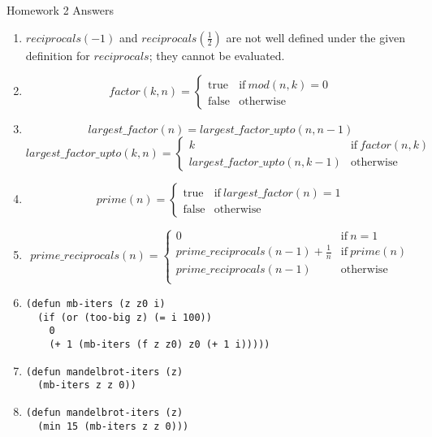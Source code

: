 \documentclass{article}
\begin{document}
  \begin{center}
    {\Large Homework 2 Answers}
  \end{center}
  \begin{enumerate}
    \item
      $reciprocals(-1)$ and $reciprocals(\frac12)$ are not well defined under the given definition for $reciprocals$; they cannot be evaluated.
    \item
      \[ factor(k, n) = \left\{
        \begin{array}{ll}
          \mathrm{true} & \mathrm{if\ } mod(n, k) = 0 \\
          \mathrm{false} & \mathrm{otherwise}
        \end{array}
      \right. \]
    \item
      \[ largest\_factor(n) = largest\_factor\_upto(n, n-1) \]
      \[ largest\_factor\_upto(k, n) = \left\{
        \begin{array}{ll}
          k & \mathrm{if\ } factor(n, k) \\
          largest\_factor\_upto(n, k-1) & \mathrm{otherwise}
        \end{array}
      \right. \]
    \item
      \[ prime(n) = \left\{
        \begin{array}{ll}
          \mathrm{true} & \mathrm{if\ } largest\_factor(n) = 1 \\
          \mathrm{false} & \mathrm{otherwise}
        \end{array}
      \right. \]
    \item
      \[ prime\_reciprocals(n) = \left\{
        \begin{array}{ll}
          0 & \mathrm{if\ } n = 1 \\
          prime\_reciprocals(n - 1) + \frac{1}{n} & \mathrm{if\ } prime(n) \\
          prime\_reciprocals(n - 1) & \mathrm{otherwise} \\
        \end{array}
      \right. \]
      
    \item
    \begin{verbatim}
(defun mb-iters (z z0 i)
  (if (or (too-big z) (= i 100))
    0
    (+ 1 (mb-iters (f z z0) z0 (+ 1 i)))))
    \end{verbatim}
    \item
    \begin{verbatim}
(defun mandelbrot-iters (z)
  (mb-iters z z 0))
    \end{verbatim}
    \item
    \begin{verbatim}
(defun mandelbrot-iters (z)
  (min 15 (mb-iters z z 0)))
    \end{verbatim}
  \end{enumerate}
\end{document}
